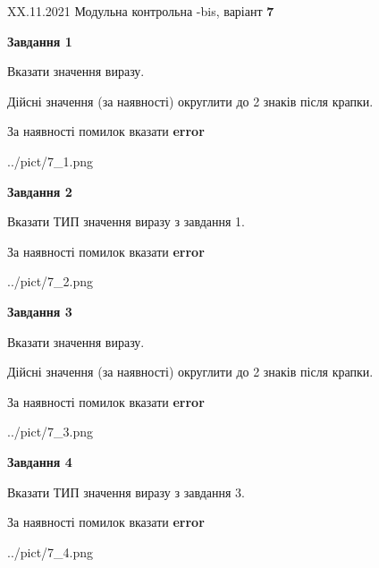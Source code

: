 \documentclass[11pt, ukrainian]{article}
\begin{document}
{XX.11.2021 Модульна контрольна -bis, варіант  \No \textbf { 7 }\par}
{
\begin {large}
{\begin {center}\textbf{Завдання 1}\end {center}}\par
Вказати значення виразу. \par
Дійсні значення (за наявності) округлити до 2 знаків після крапки. \par
За наявності помилок вказати \textbf{error}

\begin{center}
	{../pict/7_1.png}
\end{center}
\newpage

{\begin {center}\textbf{Завдання 2}\end {center}}\par
Вказати ТИП значення виразу з завдання 1. \par
За наявності помилок вказати \textbf{error}

\begin{center}
	{../pict/7_2.png}
\end{center}
\newpage

{\begin {center}\textbf{Завдання 3}\end {center}}\par
Вказати значення виразу. \par
Дійсні значення (за наявності) округлити до 2 знаків після крапки. \par
За наявності помилок вказати \textbf{error}

\begin{center}
	{../pict/7_3.png}
\end{center}
\newpage

{\begin {center}\textbf{Завдання 4}\end {center}}\par
Вказати ТИП значення виразу з завдання 3. \par
За наявності помилок вказати \textbf{error}

\begin{center}
	{../pict/7_4.png}
\end{center}
\newpage


\end{large}}
\end{document}
